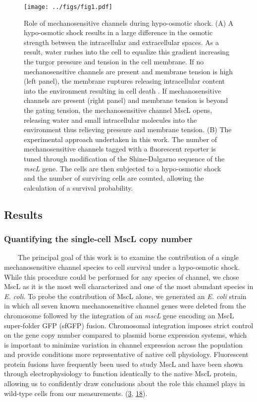 \begin{figure}
\centering
\texttt{[image: ../figs/fig1.pdf]}
\caption{Role
of
mechanosensitive
channels
during
hypo-osmotic
shock.
(A) A
hypo-osmotic
shock
results
in a
large
difference
in the
osmotic
strength
between
the
intracellular
and
extracellular
spaces.
As a
result,
water
rushes
into
the
cell
to
equalize
this
gradient
increasing
the
turgor
pressure
and
tension
in the
cell
membrane.
If no
mechanosensitive
channels
are
present
and
membrane
tension
is
high
(left
panel),
the
membrane
ruptures
releasing
intracellular
content
into
the
environment
resulting
in
cell
death
. If
mechanosensitive
channels
are
present
(right
panel)
and
membrane
tension
is
beyond
the
gating
tension,
the
mechanosensitive
channel
MscL
opens,
releasing
water
and
small
intracellular
molecules
into
the
environment
thus
relieving
pressure
and
membrane
tension.
(B)
The
experimental
approach
undertaken
in
this
work.
The
number
of
mechanosensitive
channels
tagged
with a
fluorescent
reporter
is
tuned
through
modification
of the
Shine-Dalgarno
sequence
of the
\emph{mscL}
gene.
The
cells
are
then
subjected
to a
hypo-osmotic
shock
and
the
number
of
surviving
cells
are
counted,
allowing
the
calculation
of a
survival
probability.}\label{fig:overview}
\end{figure}

\subsection{Results}\label{results}

\subsubsection{Quantifying
the
single-cell
MscL
copy
number}\label{quantifying-the-single-cell-mscl-copy-number}

~~~~The
principal
goal
of
this
work
is to
examine
the
contribution
of a
single
mechanosensitive
channel
species
to
cell
survival
under
a
hypo-osmotic
shock.
While
this
procedure
could
be
performed
for
any
species
of
channel,
we
chose
MscL
as it
is the
most
well
characterized
and
one of
the
most
abundant
species
in
\emph{E.
coli}.
To
probe
the
contribution
of
MscL
alone,
we
generated
an
\emph{E.
coli}
strain
in
which
all
seven
known
mechanosensitive
channel
genes
were
deleted
from
the
chromosome
followed
by the
integration
of an
\emph{mscL}
gene
encoding
an
MscL
super-folder
GFP
(sfGFP)
fusion.
Chromosomal
integration
imposes
strict
control
on the
gene
copy
number
compared
to
plasmid
borne
expression
systems,
which
is
important
to
minimize
variation
in
channel
expression
across
the
population
and
provide
conditions
more
representative
of
native
cell
physiology.
Fluorescent
protein
fusions
have
frequently
been
used
to
study
MscL
and
have
been
shown
through
electrophysiology
to
function
identically
to the
native
MscL
protein,
allowing
us to
confidently
draw
conclusions
about
the
role
this
channel
plays
in
wild-type
cells
from
our
measurements.
(\protect\hyperlink{ref-bialecka-fornal2012}{3},
\protect\hyperlink{ref-norman2005}{18}).

